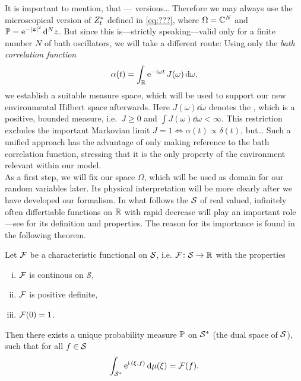It is important to mention, that --- versions\dots
Therefore we may always use the microscopical version of ${Z}^*_t$ defined in \autoref{eq:???}, where $\Omega=\mathbb{C}^N$ and $\PM=\exp[-\abs\zz^2]\dd^Nz$.
But since this is---strictly speaking---valid only for a finite number $N$ of bath oscillators, we will take a different route:
Using only the \emph{bath correlation function}
\begin{equation}
  \alpha(t) = \int_\Reals \exp[-\ii\omega t] \, J(\omega)\dd\omega,
  \label{eq:math.def_alpha}
\end{equation}
we establish a suitable measure space, which will be used to support our new environmental Hilbert space afterwards.
Here $J(\omega)\dd\omega$ denotes the , which is a positive, bounded measure, i.e.~$J\ge0$ and $\int J(\omega)\dd\omega < \infty$.
This restriction excludes the important Markovian limit $J=1 \iff \alpha(t)\propto\delta(t)$, but\dots
Such a unified approach has the advantage of only making reference to the bath correlation function, stressing that it is the only property of the environment relevant within our model.\\


As a first step, we will fix our space $\Omega$, which will be used as domain for our random variables later.
Its physical interpretation will be more clearly after we have developed our formalism.
In what follows the  $\mathcal{S}$ of real valued, infinitely often differtiable functions on $\mathbb{R}$ with rapid decrease will play an important role---see \cite[184-188]{Ru91_functional_analysis} for its definition and properties.
The reason for its importance is found in the following theorem.
\begin{thm}
  \label{thm:math.minlos}
  Let $\mathcal{F}$ be a characteristic functional on $\mathcal{S}$, i.e. $\mathcal{F}\colon \mathcal{S} \rightarrow \mathbb{R}$ with the properties
  \begin{enumerate}[i)]
    \item $\mathcal{F}$ is continous on $\mathcal{S}$,
    \item $\mathcal{F}$ is positive definite,
    \item $\mathcal{F}(0) = 1$.
  \end{enumerate}
  Then there exists a unique probability measure $\mathbb{P}$ on ${\mathcal{S}}^*$ (the dual space of $\mathcal{S}$), such that for all $f \in\mathcal{S}$
  \begin{equation}
    \int_{\dual{\SchwartzS}} \exp[\ii \, \dualp{\xi}{f}] \dd\mu(\xi) = \CHF(f).
    \label{eq:math.fourier_minlos} 
  \end{equation}
\end{thm}

